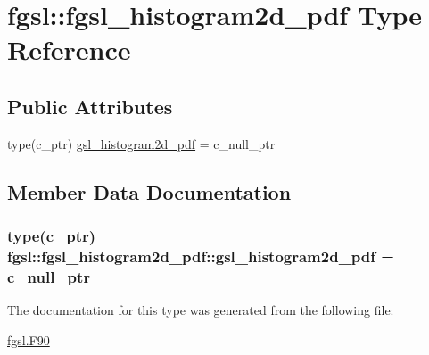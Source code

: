 \hypertarget{structfgsl_1_1fgsl__histogram2d__pdf}{\section{fgsl\-:\-:fgsl\-\_\-histogram2d\-\_\-pdf Type Reference}
\label{structfgsl_1_1fgsl__histogram2d__pdf}
}
\subsection*{Public Attributes}
\begin{DoxyCompactItemize}
\item 
type(c\-\_\-ptr) \hyperlink{structfgsl_1_1fgsl__histogram2d__pdf_aea0dbd89c006ef3985c1e17c5fe88e96}{gsl\-\_\-histogram2d\-\_\-pdf} = c\-\_\-null\-\_\-ptr
\end{DoxyCompactItemize}


\subsection{Member Data Documentation}
\hypertarget{structfgsl_1_1fgsl__histogram2d__pdf_aea0dbd89c006ef3985c1e17c5fe88e96}{
\subsubsection[{gsl\-\_\-histogram2d\-\_\-pdf}]{\setlength{\rightskip}{0pt plus 5cm}type(c\-\_\-ptr) fgsl\-::fgsl\-\_\-histogram2d\-\_\-pdf\-::gsl\-\_\-histogram2d\-\_\-pdf = c\-\_\-null\-\_\-ptr}}\label{structfgsl_1_1fgsl__histogram2d__pdf_aea0dbd89c006ef3985c1e17c5fe88e96}


The documentation for this type was generated from the following file\-:\begin{DoxyCompactItemize}
\item 
\hyperlink{fgsl_8F90}{fgsl.\-F90}\end{DoxyCompactItemize}
